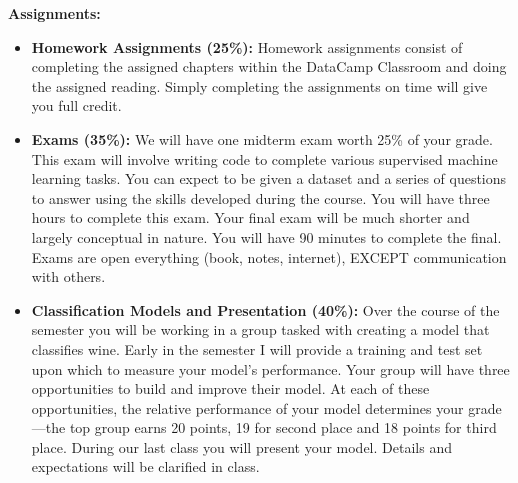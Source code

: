 \documentclass[11pt]{article}
\begin{document}
\textbf {\large Assignments:}
\begin{itemize}

			
	\item \textbf{Homework Assignments (25\%):} Homework assignments consist of completing the assigned chapters within the DataCamp Classroom and doing the assigned reading. Simply completing the assignments on time will give you full credit.
	
	\item \textbf{Exams (35\%):} We will have one midterm exam worth 25\% of your grade. This exam will involve writing code to complete various supervised machine learning tasks. You can expect to be given a dataset and a series of questions to answer using the skills developed during the course. You will have three hours to complete this exam. Your final exam will be much shorter and largely conceptual in nature. You will have 90 minutes to complete the final. Exams are open everything (book, notes, internet), EXCEPT communication with others.

	\item \textbf{Classification Models and Presentation (40\%):} Over the course of the semester you will be working in a group tasked with creating a model that classifies wine. Early in the semester I will provide a training and test set upon which to measure your model's performance. Your group will have three opportunities to build and improve their model. At each of these opportunities, the relative performance of your model determines your grade---the top group earns 20 points, 19 for second place and 18 points for third place. During our last class you will present your model. Details and expectations will be clarified in class.
\end{itemize}
\end{document}
